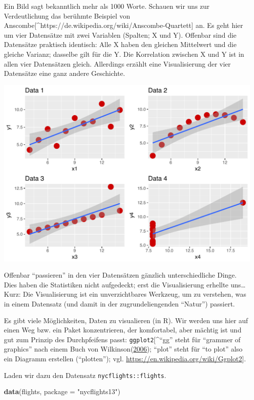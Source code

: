 \documentclass[12pt,]{book}
\newenvironment{Shaded}{\begin{snugshade}}{\end{snugshade}}
\newcommand{\KeywordTok}[1]{\textcolor[rgb]{0.13,0.29,0.53}{\textbf{{#1}}}}
\newcommand{\DataTypeTok}[1]{\textcolor[rgb]{0.13,0.29,0.53}{{#1}}}
\newcommand{\StringTok}[1]{\textcolor[rgb]{0.31,0.60,0.02}{{#1}}}
\newcommand{\NormalTok}[1]{{#1}}
\begin{document}
Ein Bild sagt bekanntlich mehr als 1000 Worte. Schauen wir uns zur
Verdeutlichung das berühmte Beispiel von
Anscombe{[}\^{}https://de.wikipedia.org/wiki/Anscombe-Quartett{]} an. Es
geht hier um vier Datensätze mit zwei Variablen (Spalten; X und Y).
Offenbar sind die Datensätze praktisch identisch: Alle X haben den
gleichen Mittelwert und die gleiche Varianz; dasselbe gilt für die Y.
Die Korrelation zwischen X und Y ist in allen vier Datensätzen gleich.
Allerdings erzählt eine Visualisierung der vier Datensätze eine ganz
andere Geschichte.

\begin{center}\includegraphics[width=0.7\linewidth]{images/anscombe} \end{center}

Offenbar ``passieren'' in den vier Datensätzen gänzlich unterschiedliche
Dinge. Dies haben die Statistiken nicht aufgedeckt; erst die
Visualisierung erhellte uns\ldots{} Kurz: Die Visualisierung ist ein
unverzichtbares Werkzeug, um zu verstehen, was in einem Datensatz (und
damit in der zugrundeliengenden ``Natur'') passiert.

Es gibt viele Möglichkeiten, Daten zu visualieren (in R). Wir werden uns
hier auf einen Weg bzw. ein Paket konzentrieren, der komfortabel, aber
mächtig ist und gut zum Prinzip des Durchpfeifens passt:
\texttt{ggplot2}{[}\^{}``gg'' steht für ``grammer of graphics'' nach
einem Buch von
Wilkinson(\protect\hyperlink{ref-wilkinson2006grammar}{2006}); ``plot''
steht für ``to plot'' also ein Diagramm erstellen (``plotten''); vgl.
\url{https://en.wikipedia.org/wiki/Ggplot2}{]}.

Laden wir dazu den Datensatz \texttt{nycflights::flights}.

\begin{Shaded}
\begin{Highlighting}[]
\KeywordTok{data}\NormalTok{(flights, }\DataTypeTok{package =} \StringTok{"nycflights13"}\NormalTok{)}
\end{Highlighting}
\end{Shaded}
\end{document}
